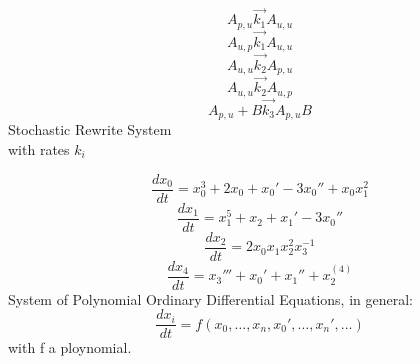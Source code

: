 \documentclass[11pt, rgb]{scrartcl}
\begin{document}
\begin{minipage}{0.49\textwidth}
\begin{center}
\[ A_{p,u} \overrightarrow{k_1} A_{u,u} \]
\[ A_{u,p} \overrightarrow{k_1} A_{u,u} \]
\[ A_{u,u} \overrightarrow{k_2} A_{p,u} \]
\[ A_{u,u} \overrightarrow{k_2} A_{u,p} \]
\[ A_{p,u} + B \overrightarrow{k_3} A_{p,u}B \]
Stochastic Rewrite System \\
with rates $k_i$
\end{center}
\end{minipage} \hfill
\begin{minipage}{0.49\textwidth}
\begin{center}
\[ \dfrac{dx_0}{dt}= x_0^3 + 2 x_0 + x_0' -3 x_0'' + x_0x_1^2 \]
\[ \dfrac{dx_1}{dt}= x_1^5 + x_2 + x_1' -3 x_0''  \]
\[ \dfrac{dx_2}{dt}= 2 x_0 x_1 x_2^2 x_3^{-1}  \]
\[ \dfrac{dx_4}{dt}= x_3''' + x_0' + x_1'' + x_2^{(4)} \]
System of Polynomial Ordinary Differential Equations, in general:
\[ \dfrac{dx_i}{dt} = f(x_0, \dots, x_n, x_0', \dots, x_n', \dots) \] 
with f a ploynomial.
\end{center}
\end{minipage}





\printbibliography
\end{document}
